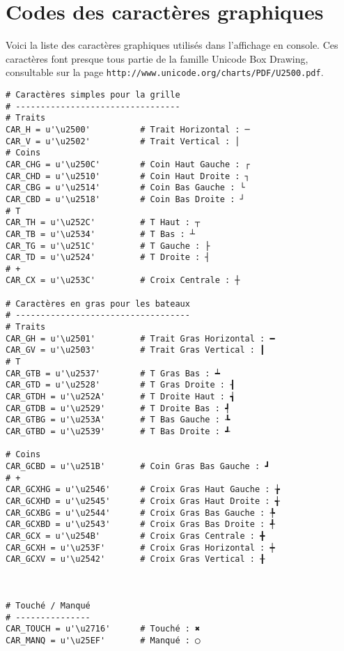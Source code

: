 \chapter{Codes des caractères graphiques}\label{annexe_codescar}

Voici la liste des caractères graphiques utilisés dans l'affichage en console. Ces caractères font presque tous partie de la famille Unicode Box Drawing, consultable sur la page \texttt{http://www.unicode.org/charts/PDF/U2500.pdf}.

\begin{verbatim}
# Caractères simples pour la grille
# ---------------------------------
# Traits
CAR_H = u'\u2500'          # Trait Horizontal : ─
CAR_V = u'\u2502'          # Trait Vertical : │
# Coins
CAR_CHG = u'\u250C'        # Coin Haut Gauche : ┌
CAR_CHD = u'\u2510'        # Coin Haut Droite : ┐
CAR_CBG = u'\u2514'        # Coin Bas Gauche : └
CAR_CBD = u'\u2518'        # Coin Bas Droite : ┘
# T
CAR_TH = u'\u252C'         # T Haut : ┬
CAR_TB = u'\u2534'         # T Bas : ┴
CAR_TG = u'\u251C'         # T Gauche : ├
CAR_TD = u'\u2524'         # T Droite : ┤
# +
CAR_CX = u'\u253C'         # Croix Centrale : ┼

# Caractères en gras pour les bateaux
# -----------------------------------
# Traits
CAR_GH = u'\u2501'         # Trait Gras Horizontal : ━
CAR_GV = u'\u2503'         # Trait Gras Vertical : ┃
# T
CAR_GTB = u'\u2537'        # T Gras Bas : ┷
CAR_GTD = u'\u2528'        # T Gras Droite : ┨
CAR_GTDH = u'\u252A'       # T Droite Haut : ┪
CAR_GTDB = u'\u2529'       # T Droite Bas : ┩
CAR_GTBG = u'\u253A'       # T Bas Gauche : ┺
CAR_GTBD = u'\u2539'       # T Bas Droite : ┹

# Coins
CAR_GCBD = u'\u251B'       # Coin Gras Bas Gauche : ┛
# +
CAR_GCXHG = u'\u2546'      # Croix Gras Haut Gauche : ╆
CAR_GCXHD = u'\u2545'      # Croix Gras Haut Droite : ╅
CAR_GCXBG = u'\u2544'      # Croix Gras Bas Gauche : ╄
CAR_GCXBD = u'\u2543'      # Croix Gras Bas Droite : ╃
CAR_GCX = u'\u254B'        # Croix Gras Centrale : ╋
CAR_GCXH = u'\u253F'       # Croix Gras Horizontal : ┿
CAR_GCXV = u'\u2542'       # Croix Gras Vertical : ╂



# Touché / Manqué
# ---------------
CAR_TOUCH = u'\u2716'      # Touché : ✖
CAR_MANQ = u'\u25EF'       # Manqué : ◯
\end{verbatim}
